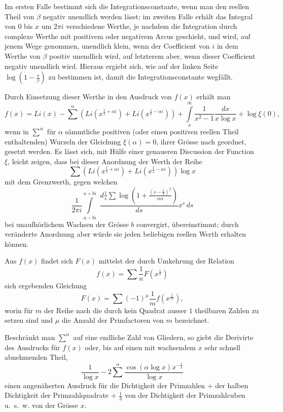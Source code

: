 \documentclass[a4paper,12pt]{article}
\begin{document}
Im ersten Falle bestimmt sich die Integrationsconstante, wenn man den
reellen Theil von $\beta$ negativ unendlich werden l\"{a}sst; im
zweiten Falle erh\"{a}lt das Integral von $0$ bis $x$ um $2\pi i$
verschiedene Werthe, je nachdem die Integration durch complexe Werthe
mit positivem oder negativem Arcus geschieht, und wird, auf jenem Wege
genommen, unendlich klein, wenn der Coefficient von $i$ in dem Werthe
von $\beta$ positiv unendlich wird, auf letzterem aber, wenn dieser
Coefficient negativ unendlich wird.  Hieraus ergiebt sich, wie auf der
linken Seite
$\displaystyle \log \left( 1 - \frac{s}{\beta} \right)$
zu bestimmen ist, damit die Integrationsconstante wegf\"{a}llt.

Durch Einsetzung dieser Werthe in den Ausdruck von $f(x)$ erh\"{a}lt
man
\[ f(x) = {Li}(x) - {\textstyle\sum^\alpha} \left(
            {Li} \left( x^{\frac{1}{2} + \alpha i} \right)
            + {Li} \left( x^{\frac{1}{2} - \alpha i} \right)
            \right)
         + \int\limits_x^\infty \frac{1}{x^2 - 1} \frac{dx}{x \log x}
         + \log \xi(0),\]
wenn in $\sum^\alpha$ f\"{u}r $\alpha$ s\"{a}mmtliche positiven (oder
einen positiven reellen Theil enthaltenden) Wurzeln der Gleichung
$\xi(\alpha) = 0$, ihrer Gr\"{o}sse nach geordnet, gesetzt werden.  Es
l\"{a}sst sich, mit H\"{u}lfe einer genaueren Discussion der
Function~$\xi$, leicht zeigen, dass bei dieser Anordnung der Werth der
Reihe
\[ {\textstyle\sum} \left(
            {Li} \left( x^{\frac{1}{2} + \alpha i} \right)
            + {Li} \left( x^{\frac{1}{2} - \alpha i} \right)
            \right) \log x \]
mit dem Grenzwerth, gegen welchen
\[ \frac{1}{2\pi i} \int\limits_{a - bi}^{a + bi} \, \,
      \frac{\displaystyle d \frac{1}{s} {\textstyle\sum}
         \log \left( 1 + \frac{(s - \frac{1}{2})^2}{\alpha \alpha}
         \right)}{ds} x^s \,ds \]
bei unaufh\"{o}rlichem Wachsen der Gr\"{o}sse $b$ convergirt,
\"{u}bereinstimmt; durch ver\"{a}nderte Anordnung aber w\"{u}rde sie
jeden beliebigen reellen Werth erhalten k\"{o}nnen.

Aus $f(x)$ findet sich $F(x)$ mittelst der durch Umkehrung der
Relation
\[ f(x) = {\textstyle\sum} \frac{1}{n}
         F \left( x^{\frac{1}{n}} \right) \]
sich ergebenden Gleichung
\[ F(x) = {\textstyle\sum} (-1)^\mu \frac{1}{m}
         f \left( x^{\frac{1}{m}} \right),\]
worin f\"{u}r $m$ der Reihe nach die durch kein Quadrat ausser $1$
theilbaren Zahlen zu setzen sind und $\mu$ die Anzahl der Primfactoren
von $m$ bezeichnet.

Beschr\"{a}nkt man $\sum^\alpha$ auf eine endliche Zahl von Gliedern,
so giebt die Derivirte des Ausdrucks f\"{u}r $f(x)$ oder, bis auf
einen mit wachsendem $x$ sehr schnell abnehmenden Theil,
\[ \frac{1}{\log x} - 2 {\textstyle\sum^\alpha}
         \frac{ \cos (\alpha \log x) x^{-\frac{1}{2}}}{\log x} \]
einen angen\"{a}herten Ausdruck f\"{u}r die Dichtigkeit der Primzahlen
$+$ der halben Dichtigkeit der Primzahlquadrate $+$ $\frac{1}{3}$ von
der Dichtigkeit der Primzahlcuben u.~s.~w. von der Gr\"{o}sse $x$.
\end{document}
